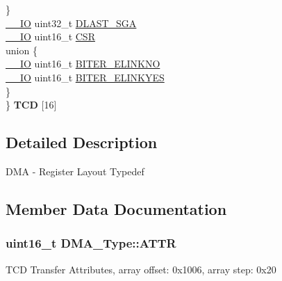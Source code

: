 \begin{DoxyCompactItemize}
\begin{tabbing}
\>\} \hypertarget{structDMA__Type_1_1_0D92_aaa66076b45156a2292edee208f8558cd}{}\label{structDMA__Type_1_1_0D92_aaa66076b45156a2292edee208f8558cd}
\\
\>\hyperlink{core__sc300_8h_aec43007d9998a0a0e01faede4133d6be}{\_\_IO} uint32\_t \hyperlink{structDMA__Type_af002f43e1ac832df5420754262d8dd61}{DLAST\_SGA}\\
\>\hyperlink{core__sc300_8h_aec43007d9998a0a0e01faede4133d6be}{\_\_IO} uint16\_t \hyperlink{structDMA__Type_a60b7ef52775eb2e3a56852fdeacc0975}{CSR}\\
\>union \{\\
\>\>\hyperlink{core__sc300_8h_aec43007d9998a0a0e01faede4133d6be}{\_\_IO} uint16\_t \hyperlink{structDMA__Type_aee2d5fcff4ca988778b0ee149090d722}{BITER\_ELINKNO}\\
\>\>\hyperlink{core__sc300_8h_aec43007d9998a0a0e01faede4133d6be}{\_\_IO} uint16\_t \hyperlink{structDMA__Type_a464e53c6509e80088037269a63565219}{BITER\_ELINKYES}\\
\>\} \hypertarget{structDMA__Type_1_1_0D92_a7d9d909e47cd0a53acd7a58c90fb1996}{}\label{structDMA__Type_1_1_0D92_a7d9d909e47cd0a53acd7a58c90fb1996}
\\
\} {\bfseries TCD} \mbox{[}16\mbox{]}\hypertarget{structDMA__Type_a57af09624ff738639588bc8c0447619d}{}\label{structDMA__Type_a57af09624ff738639588bc8c0447619d}
\\

\end{tabbing}\end{DoxyCompactItemize}


\subsection{Detailed Description}
D\+MA -\/ Register Layout Typedef 

\subsection{Member Data Documentation}
\subsubsection[{\texorpdfstring{A\+T\+TR}{ATTR}}]{ uint16\+\_\+t D\+M\+A\+\_\+\+Type\+::\+A\+T\+TR}\hypertarget{structDMA__Type_a3580edc8f45436923bf3c815fcb7d45b}{}\label{structDMA__Type_a3580edc8f45436923bf3c815fcb7d45b}
T\+CD Transfer Attributes, array offset\+: 0x1006, array step\+: 0x20 
